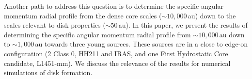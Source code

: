 Another path to address this question is to determine the specific angular momentum radial profile from the dense core scales ($\sim 10,000$\,au) 
down to the scales relevant to disk properties ($\sim 50 $\,au). 
%
In this paper, we present the results of determining the specific angular momentum radial profile from 
$\sim 10,000$\,au down to $\sim 1,000$\,au towards three young sources.
These sources are in a close to edge-on configuration (2 Class 0, HH211 and IRAS, and one First Hydrostatic Core candidate, L1451-mm).
We discuss the relevance of the results for numerical simulations of disk formation. 
